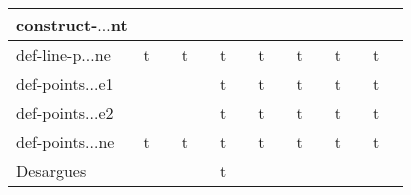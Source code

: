 {\begin{longtable}{|l|*{7}{cr|}}
\\ \hline
\cellcolor{blue!10}construct-$\ldots$nt 
& \cellcolor{yellow!25} & \cellcolor{yellow!25}{ 4} 
& \cellcolor{yellow!25} & \cellcolor{yellow!25}{ 8} 
& \cellcolor{yellow!25} & \cellcolor{yellow!25}{ 10} 
& \cellcolor{yellow!25} & \cellcolor{yellow!25}{ 228} 
& \cellcolor{yellow!25} & \cellcolor{yellow!25}{ 83} 
& \cellcolor{yellow!25} & \cellcolor{yellow!25}{ 87} 
& \cellcolor{yellow!25} & \cellcolor{yellow!25}{ 319} 
\\ \hline
\cellcolor{blue!10}def-line-p$\ldots$ne 
& \cellcolor{green!60}t & \cellcolor{green!60}{\bf 6} 
& \cellcolor{green!60}t & \cellcolor{green!60}{ 10} 
& \cellcolor{green!50}t & \cellcolor{green!50}{ 37} 
& \cellcolor{green!30}t & \cellcolor{green!30}{\sl 244} 
& \cellcolor{green!40}t & \cellcolor{green!40}{ 70} 
& \cellcolor{green!40}t & \cellcolor{green!40}{ 72} 
& \cellcolor{green!60}t & \cellcolor{green!60}{ 5} 
\\ \hline
\cellcolor{blue!10}def-points$\ldots$e1 
& \cellcolor{yellow!25} & \cellcolor{yellow!25}{ 2} 
& \cellcolor{yellow!25} & \cellcolor{yellow!25}{ 9} 
& \cellcolor{green!40}t & \cellcolor{green!40}{\bf 53} 
& \cellcolor{green!30}t & \cellcolor{green!30}{\sl 262} 
& \cellcolor{green!30}t & \cellcolor{green!30}{ 189} 
& \cellcolor{green!40}t & \cellcolor{green!40}{ 87} 
& \cellcolor{green!30}t & \cellcolor{green!30}{ 261} 
\\ \hline
\cellcolor{blue!10}def-points$\ldots$e2 
& \cellcolor{yellow!25} & \cellcolor{yellow!25}{ 4} 
& \cellcolor{yellow!25} & \cellcolor{yellow!25}{ 6} 
& \cellcolor{green!40}t & \cellcolor{green!40}{\bf 53} 
& \cellcolor{green!30}t & \cellcolor{green!30}{\sl 274} 
& \cellcolor{green!40}t & \cellcolor{green!40}{ 140} 
& \cellcolor{green!40}t & \cellcolor{green!40}{ 88} 
& \cellcolor{green!30}t & \cellcolor{green!30}{ 266} 
\\ \hline
\cellcolor{blue!10}def-points$\ldots$ne 
& \cellcolor{green!60}t & \cellcolor{green!60}{\bf 6} 
& \cellcolor{green!60}t & \cellcolor{green!60}{ 12} 
& \cellcolor{green!50}t & \cellcolor{green!50}{ 46} 
& \cellcolor{green!30}t & \cellcolor{green!30}{\sl 237} 
& \cellcolor{green!40}t & \cellcolor{green!40}{ 69} 
& \cellcolor{green!40}t & \cellcolor{green!40}{ 72} 
& \cellcolor{green!60}t & \cellcolor{green!60}{ 3} 
\\ \hline
\cellcolor{blue!10}Desargues 
& \cellcolor{yellow!25} & \cellcolor{yellow!25}{ 3} 
& \cellcolor{yellow!25} & \cellcolor{yellow!25}{ t/o} 
& \cellcolor{green!50}t & \cellcolor{green!50}{\bf 39} 
& \cellcolor{yellow!25} & \cellcolor{yellow!25}{ 3133} 

\end{longtable}}
